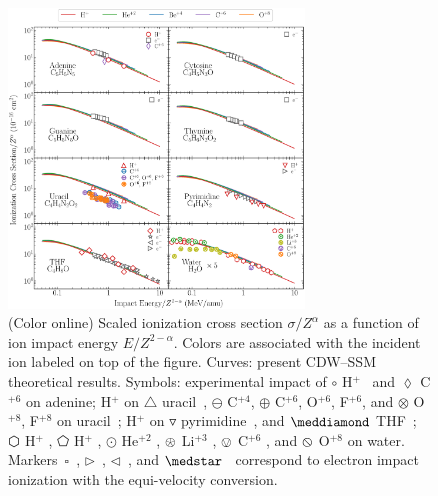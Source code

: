 \documentclass[10pt,showpacs,showkeys,twocolumn]{revtex4}
\begin{document}
\begin{figure}[!t]%
\centering
\includegraphics[width=0.7\textwidth]{zscale_alpha.eps}
\caption{(Color online) Scaled ionization cross section $\sigma/Z^{\alpha}$ as a function 
of ion impact energy $E/Z^{2-\alpha}$.%
Colors are associated with the incident ion labeled on top of the figure.
Curves: present CDW--SSM theoretical results.
Symbols: experimental impact of 
\mbox{\Large$\circ$} H$^+$~\cite{iriki2011} and 
$\lozenge$ C$^{+6}$ \cite{tribedi2019} on adenine;
H$^+$ on  $\triangle$ uracil~\cite{itoh2013}, 
$\ominus$ C$^{+4}$, 
$\oplus$ C$^{+6}$, O$^{+6}$, F$^{+6}$, and 
$\otimes$ O$^{+8}$, F$^{+8}$ on uracil~\cite{agnihotri2012,agnihotri2013};
H$^+$ on $\triangledown$ pyrimidine~\cite{wolff2014}, and
$\meddiamond$ THF~\cite{wang2016};
\mbox{\fontsize{10}{20} $\varhexagon$} H$^+$ \cite{Luna2007}, 
$\pentagon$ H$^+$ \cite{Rudd86}, 
$\odot$ He$^{+2}$ \cite{Rudd85},  
$\logof$ Li$^{+3}$ \cite{Luna_Li_water},  
$\ovee$ C$^{+6}$ \cite{DalCappello2009}, and 
$\varobslash$ O$^{+8}$ \cite{Tribedi_O_water} on water.
Markers~$\square$~\cite{rahman2016}, 
$\rhd$~\cite{bug2017}, 
$\lhd$~\cite{wolf2019}, and 
$\medstar$~\cite{fuss2009} correspond to electron impact ionization with the equi-velocity conversion.}
\label{fig:zreduced}
\end{figure} 

 
\end{document}

